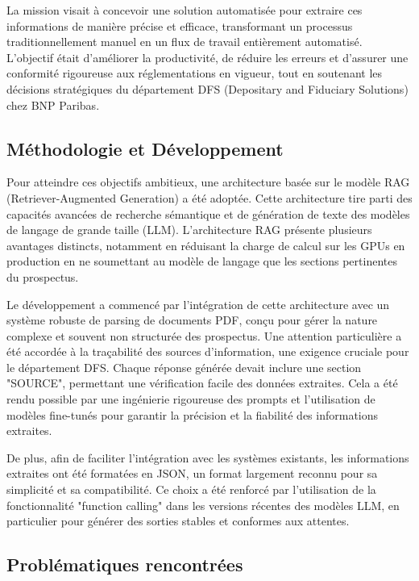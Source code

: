 \documentclass[13pt,a4paper]{article}
\begin{document}
La mission visait à concevoir une solution automatisée pour extraire ces informations de manière précise et efficace, transformant un processus traditionnellement manuel en un flux de travail entièrement automatisé. L'objectif était d'améliorer la productivité, de réduire les erreurs et d'assurer une conformité rigoureuse aux réglementations en vigueur, tout en soutenant les décisions stratégiques du département DFS (Depositary and Fiduciary Solutions) chez BNP Paribas.

\subsection{Méthodologie et Développement}

Pour atteindre ces objectifs ambitieux, une architecture basée sur le modèle RAG (Retriever-Augmented Generation) a été adoptée. Cette architecture tire parti des capacités avancées de recherche sémantique et de génération de texte des modèles de langage de grande taille (LLM). L'architecture RAG présente plusieurs avantages distincts, notamment en réduisant la charge de calcul sur les GPUs en production en ne soumettant au modèle de langage que les sections pertinentes du prospectus.

Le développement a commencé par l'intégration de cette architecture avec un système robuste de parsing de documents PDF, conçu pour gérer la nature complexe et souvent non structurée des prospectus. Une attention particulière a été accordée à la traçabilité des sources d'information, une exigence cruciale pour le département DFS. Chaque réponse générée devait inclure une section "SOURCE", permettant une vérification facile des données extraites. Cela a été rendu possible par une ingénierie rigoureuse des prompts et l'utilisation de modèles fine-tunés pour garantir la précision et la fiabilité des informations extraites.

De plus, afin de faciliter l'intégration avec les systèmes existants, les informations extraites ont été formatées en JSON, un format largement reconnu pour sa simplicité et sa compatibilité. Ce choix a été renforcé par l'utilisation de la fonctionnalité "function calling" dans les versions récentes des modèles LLM, en particulier pour générer des sorties stables et conformes aux attentes.

\subsection{Problématiques rencontrées}
\end{document}
